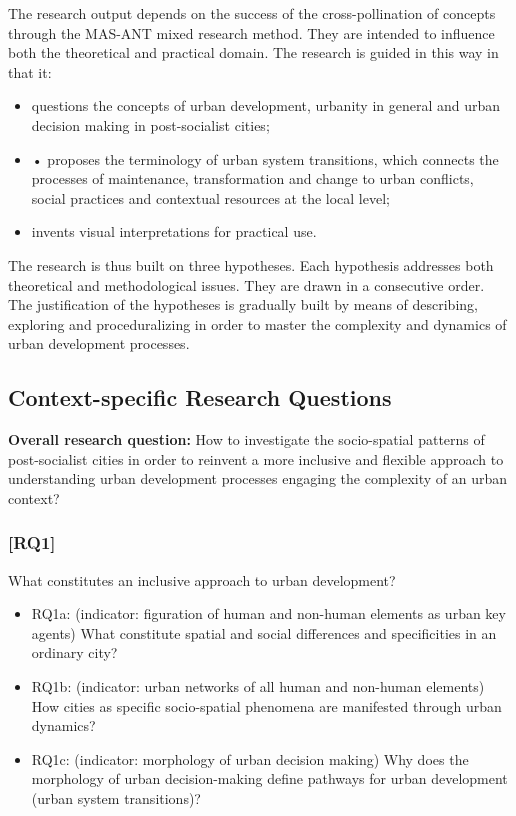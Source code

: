 \documentclass[11pt]{report}
\begin{document}
The research output depends on the success of the cross-pollination of concepts through the MAS-ANT mixed research method. They are intended to influence both the theoretical and practical domain. The research is guided in this way in that it:
\begin{itemize}
\item questions the concepts of urban development, urbanity in general and urban decision making in post-socialist cities;
\item •	proposes the terminology of urban system transitions, which connects the processes of maintenance, transformation and change to urban conflicts, social practices and contextual resources at the local level;
\item invents visual interpretations for practical use.
\end{itemize}

The research is thus built on three hypotheses. Each hypothesis addresses both theoretical and methodological issues. They are drawn in a consecutive order. The justification of the hypotheses is gradually built by means of describing, exploring and proceduralizing in order to master the complexity and dynamics of urban development processes. 

\subsection{Context-specific Research Questions}

\textbf{Overall research question:} How to investigate the socio-spatial patterns of post-socialist cities in order to reinvent a more inclusive and flexible approach to understanding urban development processes engaging the complexity of an urban context? 

\subsubsection{[RQ1]}
What constitutes an inclusive approach to urban development?
\begin{itemize}
\item RQ1a: (indicator: figuration of human and non-human elements as urban key agents) What constitute spatial and social differences and specificities in an ordinary city? 
\item RQ1b: (indicator: urban networks of all human and non-human elements) How cities as specific socio-spatial phenomena are manifested through urban dynamics?
\item RQ1c: (indicator: morphology of urban decision making) Why does the morphology of urban decision-making define pathways for urban development (urban system transitions)?
\end {itemize}
\end{document}
